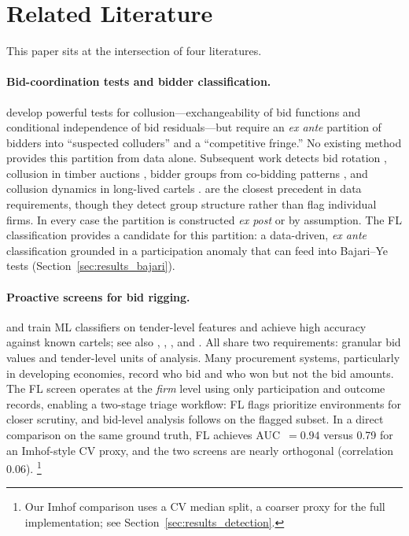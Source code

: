 \section{Related Literature}
\label{sec:literature}

This paper sits at the intersection of four literatures.

\paragraph{Bid-coordination tests and bidder classification.}
\citet{bajari2003deciding} develop powerful tests for
collusion---exchangeability of bid functions and conditional
independence of bid residuals---but require an \emph{ex ante}
partition of bidders into ``suspected colluders'' and a ``competitive
fringe.'' No existing method provides this partition from data alone.
Subsequent work detects bid rotation
\citep{porter1993detection, porter1999ohio}, collusion in timber
auctions \citep{baldwin1997bidder}, bidder groups from co-bidding
patterns \citep{conley2016detecting}, and collusion dynamics in
long-lived cartels \citep{clark2021collusion,
schurter2020identification}. \citet{conley2016detecting} are the
closest precedent in data requirements, though they detect group
structure rather than flag individual firms. In every case the
partition is constructed \emph{ex post} or by assumption. The FL
classification provides a candidate for this partition: a data-driven,
\emph{ex ante} classification grounded in a participation anomaly
that can feed into Bajari--Ye tests (Section~\ref{sec:results_bajari}).

\paragraph{Proactive screens for bid rigging.}
\citet{imhof2019detecting} and \citet{imhof2018screening} train ML
classifiers on tender-level features and achieve high accuracy against
known cartels; see also \citet{abrantesmetz2006a},
\citet{harrington2008detecting}, \citet{chassang2022robust}, and
\citet{wallimann2023machine}. All share two requirements: granular bid
values and tender-level units of analysis. Many procurement systems,
particularly in developing economies, record who bid and who won but
not the bid amounts. The FL screen operates at the \emph{firm} level
using only participation and outcome records, enabling a two-stage
triage workflow: FL flags prioritize environments for closer scrutiny,
and bid-level analysis follows on the flagged subset. In a direct
comparison on the same ground truth, FL achieves AUC~$= 0.94$ versus
0.79 for an Imhof-style CV proxy, and the two screens are nearly
orthogonal (correlation 0.06).%
\footnote{Our Imhof comparison uses a CV median split, a coarser proxy
for the full implementation; see Section~\ref{sec:results_detection}.}

